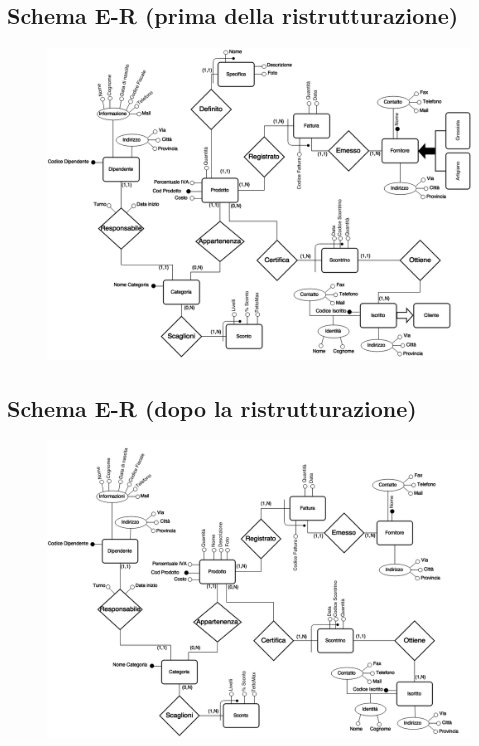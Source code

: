 
\begin{landscape}

  \thispagestyle{empty}
  
  \subsection{Schema E-R (prima della ristrutturazione)}
  
  \begin{figure}[h!]
    \centering
    \includegraphics[scale=0.6]{include/progettazioneConcettuale/schemaER/PreNorm}
  \end{figure}



\newpage


  \thispagestyle{empty}

  \subsection{Schema E-R (dopo la ristrutturazione)}

  \begin{figure}[h!]
    \centering
    \includegraphics[scale=0.6]{include/progettazioneConcettuale/schemaER/PostRistrutturaz}
  \end{figure}
  

\end{landscape}
